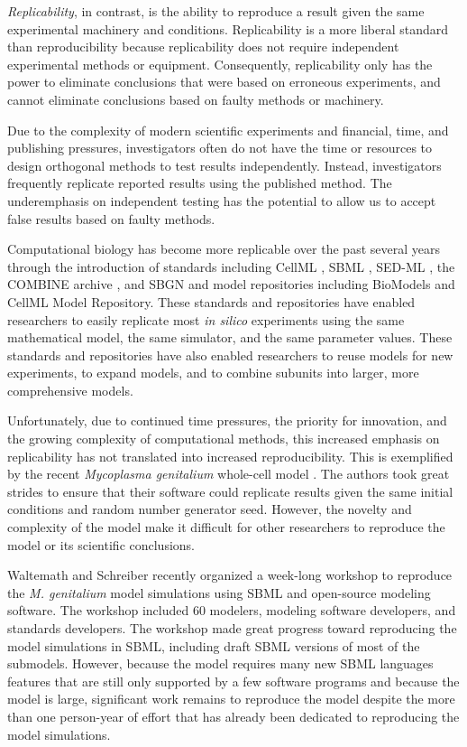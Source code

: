\documentclass[journal,transmag,twoside]{IEEEtran}
\begin{document}
\textit{Replicability}, in contrast, is the ability to reproduce a result given the same experimental machinery and conditions. 
Replicability is a more liberal standard than reproducibility because replicability does not require independent experimental methods or equipment.
Consequently, replicability only has the power to eliminate conclusions that were based on erroneous experiments, and cannot eliminate conclusions based on faulty methods or machinery.

Due to the complexity of modern scientific experiments and financial, time, and publishing pressures, investigators often do not have the time or resources to design orthogonal methods to test results independently. Instead, investigators frequently replicate reported results using the published method. The underemphasis on independent testing has the potential to allow us to accept false results based on faulty methods.

Computational biology has become more replicable over the past several years through the introduction of standards including CellML \cite{cuellar2003overview}, SBML \cite{hucka2003}, SED-ML \cite{sedml2011}, the COMBINE archive \cite{COMBINE2012}, and SBGN \cite{LeNovereHMMSS09} and model repositories including BioModels and CellML Model Repository. These standards and repositories have enabled researchers to easily replicate most \textit{in silico} experiments using the same mathematical model, the same simulator, and the same parameter values. These standards and repositories have also enabled researchers to reuse models for new experiments, to expand models, and to combine subunits into larger, more comprehensive models.

Unfortunately, due to continued time pressures, the priority for innovation, and the growing complexity of computational methods, this increased emphasis on replicability has not translated into increased reproducibility. This is exemplified by the recent \textit{Mycoplasma genitalium} whole-cell model \cite{Karr2012}. The authors took great strides to ensure that their software could replicate results given the same initial conditions and random number generator seed. However, the novelty and complexity of the model make it difficult for other researchers to reproduce the model or its scientific conclusions.

Waltemath and Schreiber recently organized a week-long workshop to reproduce the \textit{M. genitalium} model simulations using SBML and open-source modeling software. The workshop included 60 modelers, modeling software developers, and standards developers. The workshop made great progress toward reproducing the model simulations in SBML, including draft SBML versions of most of the submodels. However, because the model requires many new SBML languages features that are still only supported by a few software programs and because the model is large, significant work remains to reproduce the model despite the more than one person-year of effort that has already been dedicated to reproducing the model simulations.
\end{document}
